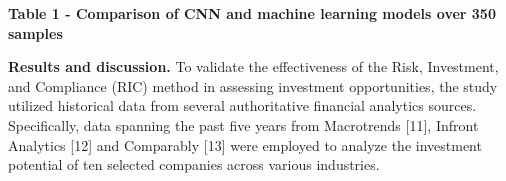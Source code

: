 {{\bfseries Table 1 - Comparison of CNN and machine learning models over 350
samples}


{\bfseries Results and discussion.} To validate the effectiveness of the
Risk, Investment, and Compliance (RIC) method in assessing investment
opportunities, the study utilized historical data from several
authoritative financial analytics sources. Specifically, data spanning
the past five years from Macrotrends {[}11{]}, Infront Analytics
{[}12{]} and Comparably {[}13{]} were employed to analyze the investment
potential of ten selected companies across various industries.

}
